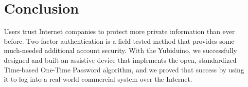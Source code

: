 \documentclass[conference]{IEEEtran}
\begin{document}
\section{Conclusion}
Users trust Internet companies to protect more private information than ever before. Two-factor authentication is a field-tested method that provides some much-needed additional account security. With the Yubiduino, we successfully designed and built an assistive device that implements the open, standardized Time-based One-Time Password algorithm, and we proved that success by using it to log into a real-world commercial system over the Internet.





\nocite{totp,
        mfa,
        totp_david,
        arduino_due,
        serial,
        mouse,
        strong_mfa,
        keyboard,
        sd,
        spi,
        rfc,
        authy,
        github}


%




\end{document}
